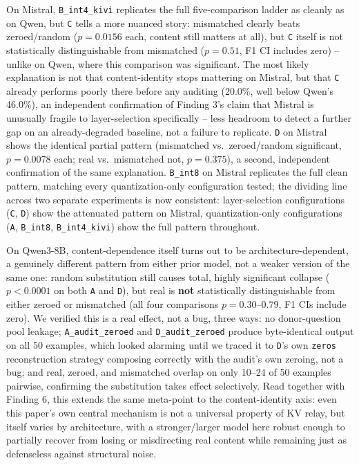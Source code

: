 \documentclass[11pt]{article}
\begin{document}


On Mistral, \texttt{B\_int4\_kivi} replicates the full five-comparison
ladder as cleanly as on Qwen, but \texttt{C} tells a more nuanced story:
mismatched clearly beats zeroed/random ($p=0.0156$ each, content still
matters at all), but \texttt{C} itself is not statistically
distinguishable from mismatched ($p=0.51$, F1 CI includes zero) --
unlike on Qwen, where this comparison was significant. The most likely
explanation is not that content-identity stops mattering on Mistral, but
that \texttt{C} already performs poorly there before any auditing
(20.0\%, well below Qwen's 46.0\%), an independent confirmation of
Finding 3's claim that Mistral is unusually fragile to layer-selection
specifically -- less headroom to detect a further gap on an
already-degraded baseline, not a failure to replicate. \texttt{D} on
Mistral shows the identical partial pattern (mismatched vs.\
zeroed/random significant, $p=0.0078$ each; real vs.\ mismatched not,
$p=0.375$), a second, independent confirmation of the same explanation.
\texttt{B\_int8} on Mistral replicates the full clean pattern, matching
every quantization-only configuration tested; the dividing line across
two separate experiments is now consistent: layer-selection configurations
(\texttt{C}, \texttt{D}) show the attenuated pattern on Mistral,
quantization-only configurations (\texttt{A}, \texttt{B\_int8},
\texttt{B\_int4\_kivi}) show the full pattern throughout.

On Qwen3-8B, content-dependence itself turns out to be
architecture-dependent, a genuinely different pattern from either prior
model, not a weaker version of the same one: random substitution still
causes total, highly significant collapse ($p<0.0001$ on both
\texttt{A} and \texttt{D}), but real is \textbf{not} statistically
distinguishable from either zeroed or mismatched (all four comparisons
$p=0.30$--$0.79$, F1 CIs include zero). We verified this is a real
effect, not a bug, three ways: no donor-question pool leakage;
\texttt{A\_audit\_zeroed} and \texttt{D\_audit\_zeroed} produce
byte-identical output on all 50 examples, which looked alarming until we
traced it to \texttt{D}'s own \texttt{zeros} reconstruction strategy
composing correctly with the audit's own zeroing, not a bug; and real,
zeroed, and mismatched overlap on only 10--24 of 50 examples pairwise,
confirming the substitution takes effect selectively. Read together with
Finding 6, this extends the same meta-point to the content-identity
axis: even this paper's own central mechanism is not a universal
property of KV relay, but itself varies by architecture, with a
stronger/larger model here robust enough to partially recover from
losing or misdirecting real content while remaining just as defenseless
against structural noise.
\end{document}
